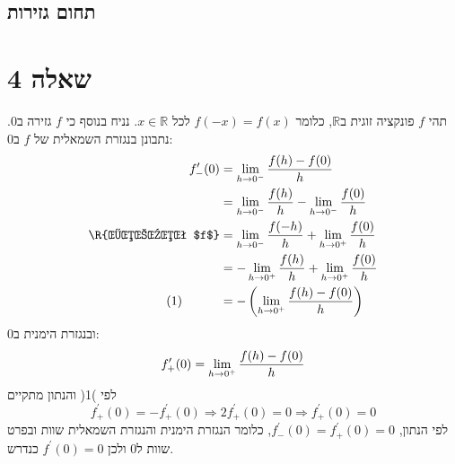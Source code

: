 \documentclass[11pt, oneside]{article}
\newcommand{\qed}{\R{$\blacksquare$}}
\newcommand{\br}{\\\\\\\\\\\\\\}
\newcommand{\mR}{\mathbb{R}}
\begin{document}
\subsection*{תחום גזירות}
\clearpage

\section*{שאלה 4}
תהי $f$ פונקציה זוגית ב$\mR$, כלומר $f(-x) = f(x)$ לכל $x \in \mR$. נניח בנוסף כי $f$ גזירה ב0. נתבונן בנגזרת השמאלית של $f$ ב0:
\begin{align*}
f^{\prime}_{-}(0)
&= \lim_{h \to 0^{-}} \frac{f(h) - f(0)}{h}\\
&= \lim_{h \to 0^{-}} \frac{f(h)}{h} - \lim_{h \to 0^{-}} \frac{f(0)}{h}\\
\text{\R{זוגיות $f$}} &= \lim_{h \to 0^{-}} \frac{f(-h)}{h} + \lim_{h \to 0^{+}} \frac{f(0)}{h}\\
&= -\lim_{h \to 0^{+}} \frac{f(h)}{h} + \lim_{h \to 0^{+}} \frac{f(0)}{h}\\
\text{(1)\quad\quad\quad} &= -\left(\lim_{h \to 0^{+}} \frac{f(h) - f(0)}{h}\right)
\end{align*}
ובנגזרת הימנית ב0:
\[
f^{\prime}_{+}(0) = \lim_{h \to 0^{+}} \frac{f(h) - f(0)}{h}\\
\]
לפי )1( והנתון מתקיים
\[
f^{\prime}_{+}(0) = -f^{\prime}_{+}(0) \Longrightarrow
2f^{\prime}_{+}(0) = 0 \Longrightarrow
f^{\prime}_{+}(0) = 0
\]
לפי הנתון, $f^{\prime}_{-}(0) = f^{\prime}_{+}(0) = 0$, כלומר הנגזרת הימנית והנגזרת השמאלית שוות ובפרט שוות ל0 ולכן $f^{\prime}(0) = 0$ כנדרש.
\br\qed
\end{document}
